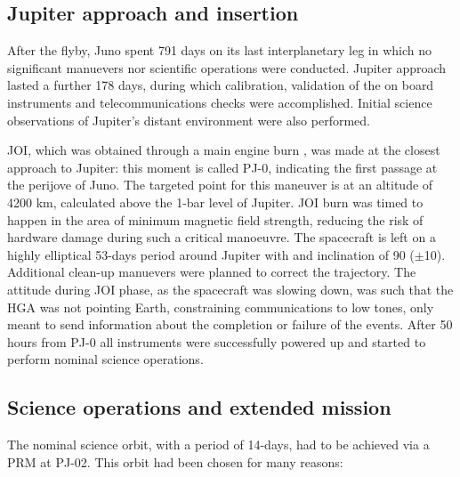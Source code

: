 \subsection{Jupiter approach and insertion}
\label{sec: joi}

After the flyby, Juno spent 791 days on its last interplanetary leg in which no significant manuevers nor scientific operations were conducted. Jupiter approach lasted a further 178 days, during which calibration, validation of the on board instruments and telecommunications checks were accomplished. Initial science observations of Jupiter's distant environment were also performed. 


JOI, %
which was obtained through a main engine burn%
, was made at the closest approach to Jupiter: this moment is called PJ-0, indicating the first passage at the perijove of Juno. The targeted point for this maneuver is at an altitude of 4200 km, calculated above the 1-bar level of Jupiter. 
JOI burn was timed to happen in the area of minimum magnetic field strength, reducing the risk of hardware damage during such a critical manoeuvre.%
 The spacecraft is left on a highly elliptical 53-days period around Jupiter with and inclination of 90\textdegree \; ($\pm$10\textdegree). Additional clean-up manuevers were planned to correct the trajectory. The attitude during JOI phase, as the spacecraft was slowing down, was such that the HGA was not pointing Earth, constraining communications to low tones, only meant to send information about the completion or failure of the events. 
After 50 hours from PJ-0 all instruments were successfully powered up and started to perform nominal science operations.

\subsection{Science operations and extended mission}
\label{sec: science ops}


The nominal science orbit, with a period of 14-days, had to be achieved via a PRM at PJ-02.  This orbit had been chosen for many reasons: 


